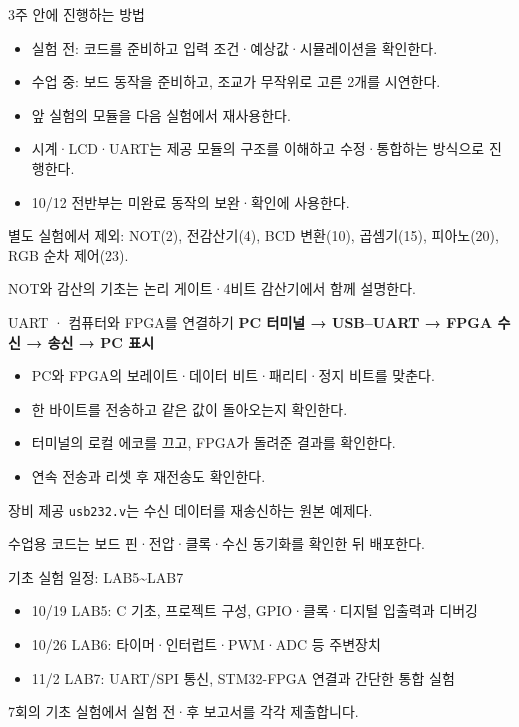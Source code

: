 \documentclass[aspectratio=169,11pt,t]{beamer}
\begin{document}
\begin{frame}{3주 안에 진행하는 방법}
\begin{itemize}
\item 실험 전: 코드를 준비하고 입력 조건·예상값·시뮬레이션을 확인한다.
\item 수업 중: 보드 동작을 준비하고, 조교가 무작위로 고른 2개를 시연한다.
\item 앞 실험의 모듈을 다음 실험에서 재사용한다.
\item 시계·LCD·UART는 제공 모듈의 구조를 이해하고 수정·통합하는 방식으로 진행한다.
\item 10/12 전반부는 미완료 동작의 보완·확인에 사용한다.
\end{itemize}
\vspace{0.2cm}
\small 별도 실험에서 제외: NOT(2), 전감산기(4), BCD 변환(10), 곱셈기(15), 피아노(20), RGB 순차 제어(23).\par
NOT와 감산의 기초는 논리 게이트·4비트 감산기에서 함께 설명한다.
\end{frame}

\begin{frame}{UART · 컴퓨터와 FPGA를 연결하기}
\textbf{PC 터미널 → USB--UART → FPGA 수신 → 송신 → PC 표시}
\vspace{0.25cm}
\begin{itemize}
\item PC와 FPGA의 보레이트·데이터 비트·패리티·정지 비트를 맞춘다.
\item 한 바이트를 전송하고 같은 값이 돌아오는지 확인한다.
\item 터미널의 로컬 에코를 끄고, FPGA가 돌려준 결과를 확인한다.
\item 연속 전송과 리셋 후 재전송도 확인한다.
\end{itemize}
\vspace{0.2cm}
\small 장비 제공 \texttt{usb232.v}는 수신 데이터를 재송신하는 원본 예제다.\par
수업용 코드는 보드 핀·전압·클록·수신 동기화를 확인한 뒤 배포한다.
\end{frame}

\begin{frame}{기초 실험 일정: LAB5\textasciitilde{}LAB7}
\begin{itemize}
\item 10/19 LAB5: C 기초, 프로젝트 구성, GPIO·클록·디지털 입출력과 디버깅
\item 10/26 LAB6: 타이머·인터럽트·PWM·ADC 등 주변장치
\item 11/2 LAB7: UART/SPI 통신, STM32-FPGA 연결과 간단한 통합 실험
\end{itemize}
\vspace{0.35cm}
7회의 기초 실험에서 실험 전·후 보고서를 각각 제출합니다.
\end{frame}
\end{document}
